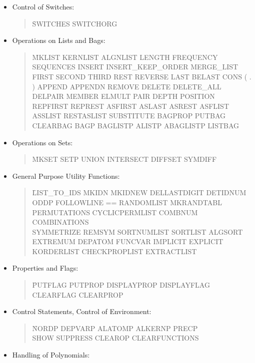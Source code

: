 \begin{itemize}
\item{Control of Switches:}
\begin{quotation}
\noindent
\f{SWITCHES SWITCHORG}
\end{quotation}
\item{Operations on Lists and Bags:}
\begin{quotation}
\noindent
\f{MKLIST KERNLIST ALGNLIST LENGTH \nl
FREQUENCY SEQUENCES  \nl
INSERT INSERT\_KEEP\_ORDER MERGE\_LIST \nl
FIRST SECOND THIRD REST REVERSE LAST \nl
BELAST CONS ( . ) APPEND APPENDN \nl
REMOVE DELETE DELETE\_ALL DELPAIR \nl
MEMBER ELMULT PAIR DEPTH POSITION \nl
REPFIRST REPREST ASFIRST ASLAST ASREST \nl
ASFLIST ASSLIST RESTASLIST SUBSTITUTE \nl
BAGPROP PUTBAG CLEARBAG BAGP BAGLISTP \nl
ALISTP ABAGLISTP LISTBAG }
\end{quotation}
\item{Operations on Sets:}
\begin{quotation}
\noindent
\f{MKSET SETP UNION INTERSECT DIFFSET SYMDIFF}
\end{quotation}
\newpage
\item{General Purpose Utility Functions:}
\begin{quotation}
\noindent
\f{LIST\_TO\_IDS MKIDN MKIDNEW DELLASTDIGIT DETIDNUM \\
ODDP FOLLOWLINE  == RANDOMLIST MKRANDTABL \\
PERMUTATIONS CYCLICPERMLIST COMBNUM COMBINATIONS  \\
SYMMETRIZE REMSYM SORTNUMLIST SORTLIST ALGSORT \\
EXTREMUM DEPATOM FUNCVAR IMPLICIT EXPLICIT \\
KORDERLIST CHECKPROPLIST EXTRACTLIST}
\end{quotation}
\item{ Properties and Flags:}
\begin{quotation}
\noindent
\f{PUTFLAG PUTPROP DISPLAYPROP DISPLAYFLAG \\
CLEARFLAG CLEARPROP }
\end{quotation}
\item{ Control Statements, Control of Environment:}
\begin{quotation}
\noindent
\f{NORDP DEPVARP ALATOMP ALKERNP PRECP \\
 SHOW SUPPRESS CLEAROP CLEARFUNCTIONS }
\end{quotation}
\item{Handling of Polynomials:}
\begin{quotation}
\noindent

\end{quotation}
\end{itemize}
